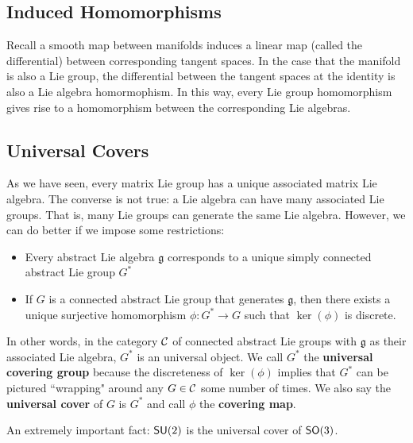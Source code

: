 \subsection{Induced Homomorphisms}
Recall a smooth map between manifolds induces a linear map (called the differential) between corresponding tangent spaces. In the case that the manifold is also a Lie group, the differential between the tangent spaces at the identity is also a Lie algebra homormophism. In this way, every Lie group homomorphism gives rise to a homomorphism between the corresponding Lie algebras.

\subsection{Universal Covers}
As we have seen, every matrix Lie group has a unique associated matrix Lie algebra. The converse is not true: a Lie algebra can have many associated Lie groups. That is, many Lie groups can generate the same Lie algebra. However, we can do better if we impose some restrictions:
\begin{itemize}
    \item Every abstract Lie algebra $\mathfrak g$ corresponds to a unique simply connected abstract Lie group $G^*$
    \item If $G$ is a connected abstract Lie group that generates $\mathfrak g$, then there exists a unique surjective homomorphism $\phi: G^* \rightarrow G$ such that $\ker(\phi)$ is discrete.
\end{itemize}
In other words, in the category ${\mathcal C}$ of connected abstract Lie groups with $\mathfrak g$ as their associated Lie algebra, $G^*$ is an universal object. We call $G^*$ the \textbf{universal covering group} because the discreteness of $\ker(\phi)$ implies that $G^*$ can be pictured ``wrapping" around any $G \in {\mathcal C}$ some number of times. We also say the \textbf{universal cover} of $G$ is $G^*$ and call $\phi$ the \textbf{covering map}.

An extremely important fact: $\operatorname{\textsf{SU}}(2)$ is the universal cover of $\operatorname{\textsf{SO}}(3)$.
